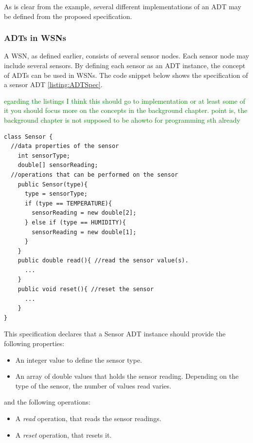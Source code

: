 As is clear from the example, several different implementations of an ADT may
be defined from the proposed specification.

\subsubsection{ADTs in WSNs} \label{subsubsec:ADTsinWSN}

A WSN, as defined earlier, consists of several sensor nodes. Each sensor node
may include several sensors. By defining each sensor as
an ADT instance, the concept of ADTs can be used in WSNs. The code snippet below
shows the specification of a sensor ADT \ref{listing:ADTSpec}.   

\textcolor{green}{egarding the listings
I think this should go to implementation
or at least some of it
you should focus more on the concepts in the background chapter. point is, the
background chapter is not supposed to be ahowto for programming sth already}
  
\lstset{language = Java}  
 \begin{lstlisting}[frame=trbl, basewidth={0.55em, 0.6em}, captionpos=b, basicstyle=\ttfamily\footnotesize, breaklines, caption = Sensor ADT specification (reproduced from \cite{migliavacca_DADT:2006}), label = listing:ADTSpec ]
class Sensor {
  //data properties of the sensor 
    int sensorType;
    double[] sensorReading;
  //operations that can be performed on the sensor  
	public Sensor(type){
	  type = sensorType;
	  if (type == TEMPERATURE){
		sensorReading = new double[2];
	  }	else if (type == HUMIDITY){
		sensorReading = new double[1];
	  }
	}
    public double read(){ //read the sensor value(s).
	  ...
	} 
	public void reset(){ //reset the sensor
	  ...
	}
}
\end{lstlisting}

This specification declares that a Sensor ADT instance should provide the
following properties:
\begin{itemize}
\item An integer value to define the sensor type.   
\item An array of double values that holds the sensor reading. Depending on the
type of the sensor, the number of values read varies.
\end{itemize}

and the following operations:
\begin{itemize}
  \item A \emph{read} operation, that reads the sensor readings.
  \item A \emph{reset} operation, that resets it.
\end{itemize}

